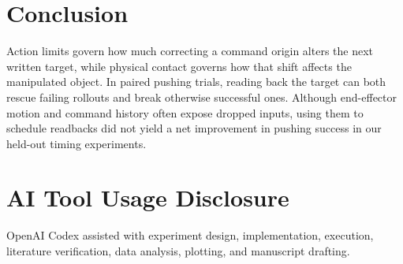 \section{Conclusion}

Action limits govern how much correcting a command origin alters the next written target, while physical contact governs how that shift affects the manipulated object. In paired pushing trials, reading back the target can both rescue failing rollouts and break otherwise successful ones. Although end-effector motion and command history often expose dropped inputs, using them to schedule readbacks did not yield a net improvement in pushing success in our held-out timing experiments.

\section*{AI Tool Usage Disclosure}

OpenAI Codex assisted with experiment design, implementation, execution, literature verification, data analysis, plotting, and manuscript drafting.

\flushcolsend

\clearpage

\raggedcolsend


